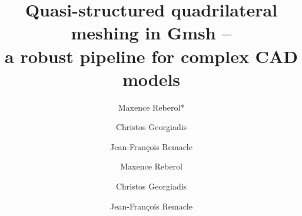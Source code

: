 \documentclass[AMA,STIX1COL]{WileyNJD-v2}
\begin{document}
\title{Quasi-structured quadrilateral meshing in Gmsh -- \\a robust pipeline for complex CAD models}


\ifnum{}  %

\author[1]{Maxence Reberol*}

\author[1]{Christos Georgiadis}

\author[1]{Jean-Fran{\c c}ois Remacle}



\address[1]{, }


\else %

\date{}
\author[1]{Maxence Reberol}
\author[1]{Christos Georgiadis}
\author[1]{Jean-Fran{\c c}ois Remacle}

\fi %

\end{document}

